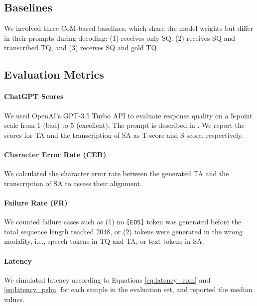 \subsection{Baselines}

\label{sec:baselines}
We involved three CoM-based baselines, which share the model weights but differ in their prompts during decoding: (1)  receives only SQ, (2)  receives SQ and transcribed TQ, and (3)  receives SQ and gold TQ.

\subsection{Evaluation Metrics}
\label{sec:metrics}
\paragraph{ChatGPT Scores}
We used OpenAI's GPT-3.5 Turbo API to evaluate response quality on a 5-point scale from 1 (bad) to 5 (excellent).
The prompt is described in .
We report the scores for TA and the transcription of SA as T-score and S-score, respectively.

\paragraph{Character Error Rate (CER)}
We calculated the character error rate between the generated TA and the transcription of SA to assess their alignment.

\paragraph{Failure Rate (FR)}
We counted failure cases such as (1) no \texttt{[EOS]} token was generated before the total sequence length reached 2048, or (2) tokens were generated in the wrong modality, i.e., speech tokens in TQ and TA, or text tokens in SA. 

\paragraph{Latency}
We simulated latency according to Equations \ref{eq:latency_com} and \ref{eq:latency_pslm} for each sample in the evaluation set, and reported the median values.

